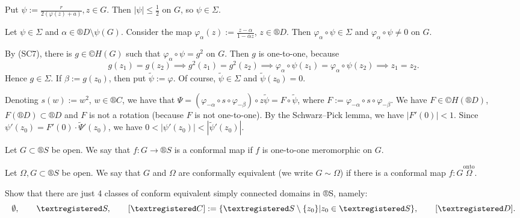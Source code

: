 \documentclass[12pt]{article}					%
\begin{document}
\begin{veta}[Riemann]
\begin{dukazin}
		Put $ψ := \frac{r}{2(φ(z) + a)}, z \in G$. Then $|ψ| ≤ \frac{1}{2}$ on $G$, so $ψ \in Σ$.
	\end{dukazin}

	\begin{dukazin}
		Let $ψ \in Σ$ and $α \in ®D \setminus ψ(G)$. Consider the map $φ_α(z) := \frac{z - α}{1 - \overline{α}z}$, $z \in ®D$. Then $φ_α ∘ ψ \in Σ$ and $φ_α ∘ ψ ≠ 0$ on $G$.

		By (SC7), there is $g \in ©H(G)$ such that $φ_α ∘ ψ = g^2$ on $G$. Then $g$ is one-to-one, because
		$$ g(z_1) = g(z_2) \implies g^2(z_1) = g^2(z_2) \implies φ_α ∘ ψ(z_1) = φ_α ∘ ψ(z_2) \implies z_1 = z_2. $$
		Hence $g \in Σ$. If $β := g(z_0)$, then put $\tilde ψ := φ$. Of course, $\tilde ψ \in Σ$ and $\tilde ψ(z_0) = 0$.

		Denoting $s(w) := w^2$, $w \in ®C$, we have that $Ψ = (φ_{-α} ∘ s ∘ φ_{-β}) ∘ z\tilde ψ = F ∘ \tilde ψ$, where $F := φ_{-α} ∘ s ∘ φ_{-β}$. We have $F \in ©H(®D)$, $F(®D) \subset ®D$ and $F$ is not a rotation (because $F$ is not one-to-one). By the Schwarz–Pick lemma, we have $|F'(0)| < 1$. Since $ψ'(z_0) = F'(0)·\tilde Ψ'(z_0)$, we have $0 < |ψ'(z_0)| < |\tilde ψ'(z_0)|$.
	\end{dukazin}
\end{veta}

\begin{definice}
	Let $G \subset ®S$ be open. We say that $f: G \rightarrow ®S$ is a conformal map if $f$ is one-to-one meromorphic on $G$.
\end{definice}

\begin{definice}
	Let $Ω, G \subset ®S$ be open. We say that $G$ and $Ω$ are conformally equivalent (we write $G \sim Ω$) if there is a conformal map $f: G \overset{\text{onto}} Ω$.
\end{definice}

\begin{priklad}
	Show that there are just 4 classes of conform equivalent simply connected domains in ®S, namely:
	$$ \O, \qquad ®S, \qquad [®C] := \{®S \setminus \{z_0\} | z_0 \in ®S\}, \qquad [®D]. $$
\end{priklad}
\end{document}
